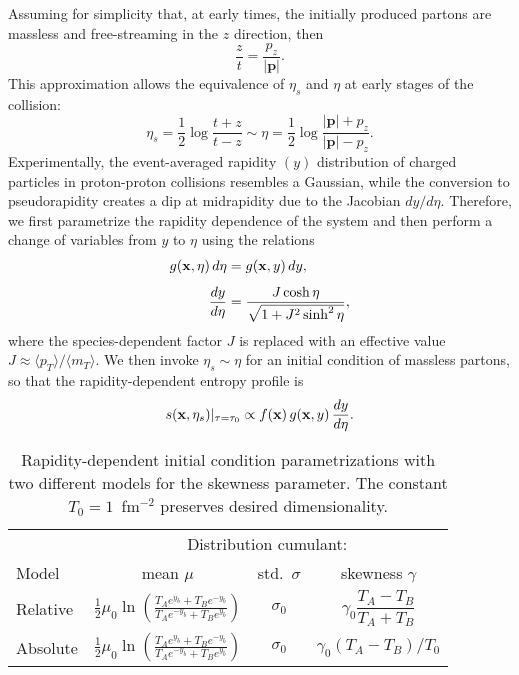 Assuming for simplicity that, at early times, the initially produced partons are massless and free-streaming in the $z$ direction, then
\begin{equation}
  \frac{z}{t} = \frac{p_z}{|\mathbf p|}.
\end{equation}
This approximation allows the equivalence of $\eta_s$ and $\eta$ at early stages of the collision:
\begin{equation}
  \eta_s = \frac{1}{2}\log\frac{t+z}{t-z} \sim \eta = \frac{1}{2}\log\frac{|\mathbf p|+p_z}{|\mathbf p|-p_z}.
\end{equation}
Experimentally, the event-averaged rapidity $(y)$ distribution of charged particles in proton-proton collisions resembles a Gaussian, while the conversion to pseudorapidity creates a dip at midrapidity due to the Jacobian $dy/d\eta$.
Therefore, we first parametrize the rapidity dependence of the system and then perform a change of variables from $y$ to $\eta$ using the relations
\begin{align}
  g(\mathbf x, \eta)\, d\eta &= g(\mathbf x, y)\, dy, \\[1ex]
  \frac{dy}{d\eta} &= \frac{J \cosh \eta}{\sqrt{1 + J^2 \sinh^2 \eta}},
  \label{jacobian}
\end{align}
where the species-dependent factor $J$ is replaced with an effective value $J \approx \langle p_T \rangle / \langle m_T \rangle$.
We then invoke $\eta_s \sim \eta$ for an initial condition of massless partons, so that the rapidity-dependent entropy profile is
\begin{equation}
  s(\mathbf x, \eta_s)\vert_{\tau=\tau_0} \propto f(\mathbf x)\, g(\mathbf x, y)\, \frac{dy}{d\eta}.
\end{equation}

\begin{table}
  \caption{
    \label{tab:parametrization}
    Rapidity-dependent initial condition parametrizations with two different models for the skewness parameter. The constant $T_0 = 1$~fm$^{-2}$ preserves desired dimensionality.
  }

    \begin{tabular}{lccc}
      & \multicolumn{3}{c}{Distribution cumulant:} \\
      \noalign{\smallskip}\cline{2-4}\noalign{\smallskip}
      Model & \multicolumn{1}{c}{mean $\mu$} & \multicolumn{1}{c}{std.\ $\sigma$} & \multicolumn{1}{c}{skewness $\gamma$} \\
      \paddedhline \noalign{\smallskip}
        Relative  & $\frac{1}{2} \mu_0 \ln\left(\frac{T_A e^{y_b}+T_B e^{-y_b}}{T_A e^{-y_b} + T_B e^{y_b}}\right)$ & $\sigma_0$ & $\gamma_0 \dfrac{T_A - T_B}{T_A + T_B}$ \smallskip\\
        Absolute & $\frac{1}{2} \mu_0 \ln\left(\frac{T_A e^{y_b}+T_B e^{-y_b}}{T_A e^{-y_b} + T_B e^{y_b}}\right)$  & $\sigma_0$ & $\gamma_0 (T_A - T_B)/T_0$\smallskip
    \end{tabular}

\end{table}

